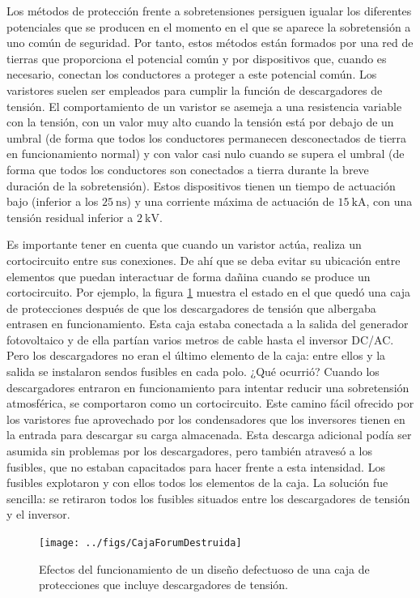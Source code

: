 Los métodos de protección frente a sobretensiones persiguen igualar
los diferentes potenciales que se producen en el momento en el que se
aparece la sobretensión a uno común de seguridad. Por tanto, estos
métodos están formados por una red de tierras que proporciona el
potencial común y por dispositivos que, cuando es necesario, conectan
los conductores a proteger a este potencial común. Los varistores
suelen ser empleados para cumplir la función de descargadores de
tensión. El comportamiento de un varistor se asemeja a una resistencia
variable con la tensión, con un valor muy alto cuando la tensión está
por debajo de un umbral (de forma que todos los conductores permanecen
desconectados de tierra en funcionamiento normal) y con valor casi
nulo cuando se supera el umbral (de forma que todos los conductores
son conectados a tierra durante la breve duración de la
sobretensión). Estos dispositivos tienen un tiempo de actuación bajo
(inferior a los $\SI{25}{\nano\second}$) y una corriente máxima de
actuación de $\SI{15}{\kilo\ampere}$, con una tensión residual
inferior a $\SI{2}{\kilo\volt}$.

Es importante tener en cuenta que cuando un varistor actúa, realiza un
cortocircuito entre sus conexiones. De ahí que se deba evitar su
ubicación entre elementos que puedan interactuar de forma dañina
cuando se produce un cortocircuito. Por ejemplo, la figura
\ref{fig:EfectosVaristor} muestra el estado en el que quedó una caja
de protecciones después de que los descargadores de tensión que
albergaba entrasen en funcionamiento. Esta caja estaba conectada a la
salida del generador fotovoltaico y de ella partían varios metros de
cable hasta el inversor DC/AC. Pero los descargadores no eran el
último elemento de la caja: entre ellos y la salida se instalaron
sendos fusibles en cada polo. ¿Qué ocurrió?  Cuando los descargadores
entraron en funcionamiento para intentar reducir una sobretensión
atmosférica, se comportaron como un cortocircuito.  Este camino fácil
ofrecido por los varistores fue aprovechado por los condensadores que
los inversores tienen en la entrada para descargar su carga
almacenada. Esta descarga adicional podía ser asumida sin problemas
por los descargadores, pero también atravesó a los fusibles, que no
estaban capacitados para hacer frente a esta intensidad. Los fusibles
explotaron y con ellos todos los elementos de la caja. La solución fue
sencilla: se retiraron todos los fusibles situados entre los
descargadores de tensión y el inversor.

%
\begin{figure}
\begin{centering}
\texttt{[image: ../figs/CajaForumDestruida]}
\end{centering}

\caption{Efectos del funcionamiento de un diseño defectuoso de una caja de
protecciones que incluye descargadores de tensión.\label{fig:EfectosVaristor}}

\end{figure}



